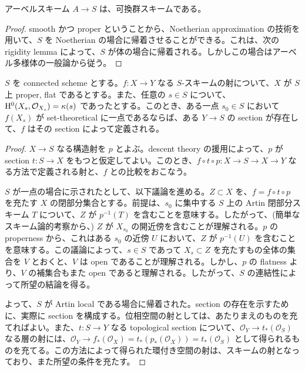 \begin{prop}
  アーベルスキーム $A \to S$ は、可換群スキームである。
\end{prop}
\begin{proof}
  smooth かつ proper ということから、Noetherian approximation の技術を用いて、$S$ を Noetherian の場合に帰着させることができる。これは、次の rigidity lemma によって、$S$ が体の場合に帰着される。しかしこの場合はアーベル多様体の一般論から従う。
\end{proof}

\begin{lem}
  $S$ を connected scheme とする。$f \colon X \to Y$ なる $S$-スキームの射について、$X$ が $S$ 上 proper, flat であるとする。また、任意の $s \in S$ について、$\mathrm{H}^0(X_s, \mathcal{O}_{X_s}) = \kappa(s)$ であったとする。このとき、ある一点 $s_0 \in S$ において $f(X_s)$ が set-theoretical に一点であるならば、ある $Y \to S$ の section が存在して、$f$ はその section によって定義される。
\end{lem}
\begin{proof}
  $X \to S$ なる構造射を $p$ とよぶ。descent theory の援用によって、$p$ が section $t \colon S \to X$ をもつと仮定してよい。このとき、$f \circ t \circ p : X \to S \to X \to Y$ なる方法で定義される射と、$f$ との比較をおこなう。

  $S$ が一点の場合に示されたとして、以下議論を進める。$Z \subset X$ を、$f = f \circ t \circ p$ を充たす $X$ の閉部分集合とする。前提は、$s_0$ に集中する $S$ 上の Artin 閉部分スキーム $T$ について、$Z$ が $p^{-1}(T)$ を含むことを意味する。したがって、(簡単なスキーム論的考察から、) $Z$ が $X_{s_0}$ の開近傍を含むことが理解される。$p$ の properness から、これはある $s_0$ の近傍 $U$ において、$Z$ が $p^{-1}(U)$ を含むことを意味する。この議論によって、$s \in S$ であって $X_s \subset Z$ を充たすもの全体の集合を $V$ とおくと、$V$ は open であることが理解される。しかし、$p$ の flatness より、$V$ の補集合もまた open であると理解される。したがって、$S$ の連結性によって所望の結論を得る。

  よって、$S$ が Artin local である場合に帰着された。section の存在を示すために、実際に section を構成する。位相空間の射としては、あたりまえのものを充てればよい。また、$t \colon S \to Y$ なる topological section について、$\mathcal{O}_Y \to t_*(\mathcal{O}_S)$ なる層の射には、$\mathcal{O}_Y \to f_*(\mathcal{O}_X) = t_*(p_*(\mathcal{O}_X)) = t_*(\mathcal{O}_S)$ として得られるものを充てる。この方法によって得られた環付き空間の射は、スキームの射となっており、また所望の条件を充たす。
\end{proof}

